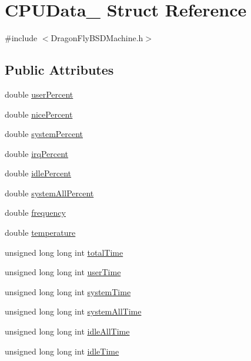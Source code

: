 \hypertarget{structCPUData__}{}\section{C\+P\+U\+Data\+\_\+ Struct Reference}
\label{structCPUData__}


{\ttfamily \#include $<$Dragon\+Fly\+B\+S\+D\+Machine.\+h$>$}

\subsection*{Public Attributes}
\begin{DoxyCompactItemize}
\item 
double \hyperlink{structCPUData___ac5017a38683ebfbe2a06e6ed45aa1eaf}{user\+Percent}
\item 
double \hyperlink{structCPUData___a6db9873ed198a4990acad76704f991a3}{nice\+Percent}
\item 
double \hyperlink{structCPUData___aea07f68fbdb9c79a35f44cf9d8578a4c}{system\+Percent}
\item 
double \hyperlink{structCPUData___ae2292e705bc0361bdc19934caeac74d7}{irq\+Percent}
\item 
double \hyperlink{structCPUData___ac0e7b2f10e3c9d9ca4f6a542adc2d9a0}{idle\+Percent}
\item 
double \hyperlink{structCPUData___a417f62add6c11a61dd6c83de75afff38}{system\+All\+Percent}
\item 
double \hyperlink{structCPUData___a600b87c43bb00c4bd2a5057cd35c7b1f}{frequency}
\item 
double \hyperlink{structCPUData___a2409b069a37e7bac3722841bb722fff4}{temperature}
\item 
unsigned long long int \hyperlink{structCPUData___ad193ad83eaca3849e8c7724474e95e08}{total\+Time}
\item 
unsigned long long int \hyperlink{structCPUData___aa4b5a7bd97dd3377e3434cdc3cc552c4}{user\+Time}
\item 
unsigned long long int \hyperlink{structCPUData___accff1ab5c593b648d2f42a91f470a8da}{system\+Time}
\item 
unsigned long long int \hyperlink{structCPUData___a4251e6ba42edff5922e5d0001a6c5dcd}{system\+All\+Time}
\item 
unsigned long long int \hyperlink{structCPUData___aef7bdee38895b6e32422e29b9db27aef}{idle\+All\+Time}
\item 
unsigned long long int \hyperlink{structCPUData___aa303aeb47f2940d01bfb749ea38c852c}{idle\+Time}

\end{DoxyCompactItemize}
